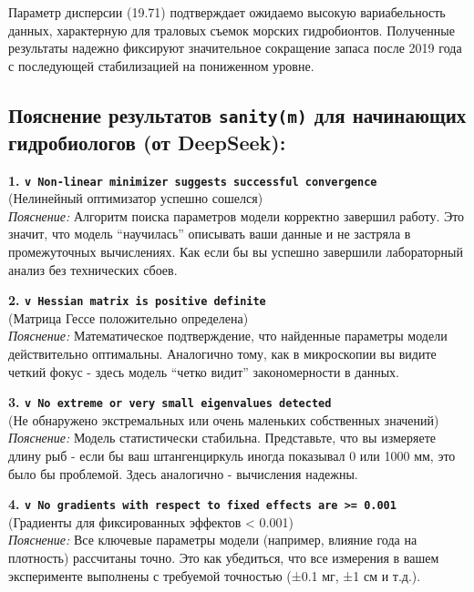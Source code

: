 \documentclass[
  letterpaper,
  DIV=11,
  numbers=noendperiod]{scrreprt}
\begin{document}
\begin{itemize}
  Параметр дисперсии (19.71) подтверждает ожидаемо высокую
  вариабельность данных, характерную для траловых съемок морских
  гидробионтов. Полученные результаты надежно фиксируют значительное
  сокращение запаса после 2019 года с последующей стабилизацией на
  пониженном уровне.

  \subsection{\texorpdfstring{\textbf{Пояснение результатов
  \texttt{sanity(m)} для начинающих гидробиологов (от
  DeepSeek):}}{Пояснение результатов sanity(m) для начинающих гидробиологов (от DeepSeek):}}\label{ux43fux43eux44fux441ux43dux435ux43dux438ux435-ux440ux435ux437ux443ux43bux44cux442ux430ux442ux43eux432-sanitym-ux434ux43bux44f-ux43dux430ux447ux438ux43dux430ux44eux449ux438ux445-ux433ux438ux434ux440ux43eux431ux438ux43eux43bux43eux433ux43eux432-ux43eux442-deepseek}

  \textbf{1.
  \texttt{v\ Non-linear\ minimizer\ suggests\ successful\ convergence}}\\
  (Нелинейный оптимизатор успешно сошелся)\\
  \emph{Пояснение:} Алгоритм поиска параметров модели корректно завершил
  работу. Это значит, что модель ``научилась'' описывать ваши данные и
  не застряла в промежуточных вычислениях. Как если бы вы успешно
  завершили лабораторный анализ без технических сбоев.

  \textbf{2. \texttt{v\ Hessian\ matrix\ is\ positive\ definite}}\\
  (Матрица Гессе положительно определена)\\
  \emph{Пояснение:} Математическое подтверждение, что найденные
  параметры модели действительно оптимальны. Аналогично тому, как в
  микроскопии вы видите четкий фокус - здесь модель ``четко видит''
  закономерности в данных.

  \textbf{3.
  \texttt{v\ No\ extreme\ or\ very\ small\ eigenvalues\ detected}}\\
  (Не обнаружено экстремальных или очень маленьких собственных
  значений)\\
  \emph{Пояснение:} Модель статистически стабильна. Представьте, что вы
  измеряете длину рыб - если бы ваш штангенциркуль иногда показывал 0
  или 1000 мм, это было бы проблемой. Здесь аналогично - вычисления
  надежны.

  \textbf{4.
  \texttt{v\ No\ gradients\ with\ respect\ to\ fixed\ effects\ are\ \textgreater{}=\ 0.001}}\\
  (Градиенты для фиксированных эффектов \textless{} 0.001)\\
  \emph{Пояснение:} Все ключевые параметры модели (например, влияние
  года на плотность) рассчитаны точно. Это как убедиться, что все
  измерения в вашем эксперименте выполнены с требуемой точностью (±0.1
  мг, ±1 см и т.д.).


\end{itemize}
\end{document}
